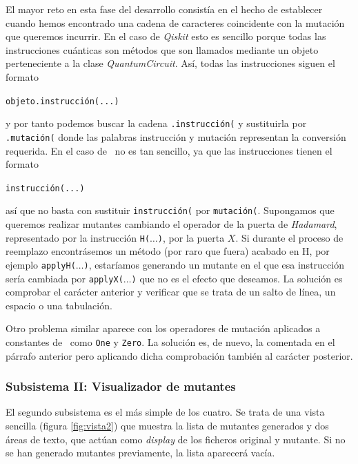 El mayor reto en esta fase del desarrollo consistía en el hecho de establecer cuando hemos encontrado una cadena de caracteres coincidente con la mutación que queremos incurrir. En el caso de \textit{Qiskit} esto es sencillo porque todas las instrucciones cuánticas son métodos que son llamados mediante un objeto perteneciente a la clase \textit{QuantumCircuit}. Así, todas las instrucciones siguen el formato
\begin{center}
\texttt{objeto.instrucción(...)}
\end{center}
y por tanto podemos buscar la cadena \texttt{.instrucción(} y sustituirla por \texttt{.mutación(} donde las palabras instrucción y mutación representan la conversión requerida. En el caso de \qsh\ no es tan sencillo, ya que las instrucciones tienen el formato
\begin{center}
\texttt{instrucción(...)}
\end{center}
así que no basta con sustituir \texttt{instrucción(} por \texttt{mutación(}. Supongamos que queremos realizar mutantes cambiando el operador de la puerta de \textit{Hadamard}, representado por la instrucción \texttt{H($\ldots$)}, por la puerta $X$. Si durante el proceso de reemplazo encontrásemos un método (por raro que fuera) acabado en H, por ejemplo \texttt{applyH($\ldots$)}, estaríamos generando un mutante en el que esa instrucción sería cambiada por \texttt{applyX($\ldots$)} que no es el efecto que deseamos. La solución es comprobar el carácter anterior y verificar que se trata de un salto de línea, un espacio o una tabulación.

Otro problema similar aparece con  los operadores de mutación aplicados a constantes de \qsh\ como \texttt{One} y \texttt{Zero}. La solución es, de nuevo, la comentada en el párrafo anterior pero aplicando dicha comprobación también al carácter posterior.

\subsubsection{Subsistema II: Visualizador de mutantes}

El segundo subsistema es el más simple de los cuatro. Se trata de una vista sencilla (figura \ref{fig:vista2}) que muestra la lista de mutantes generados y dos áreas de texto, que actúan como \textit{display} de los ficheros original y mutante. Si no se han generado mutantes previamente, la lista aparecerá vacía.


